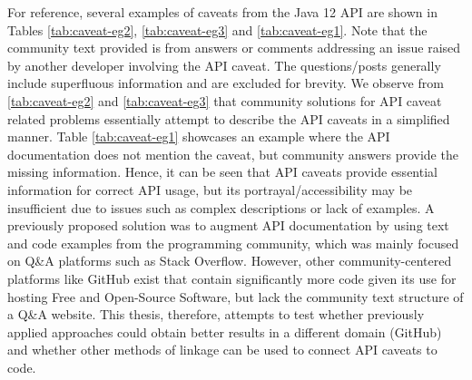 For reference, several examples of caveats from the Java 12 API are shown in Tables \ref{tab:caveat-eg2}, \ref{tab:caveat-eg3} and \ref{tab:caveat-eg1}. Note that the community text provided is from answers or comments addressing an issue raised by another developer involving the API caveat. The questions/posts generally include superfluous information and are excluded for brevity. We observe from \ref{tab:caveat-eg2} and \ref{tab:caveat-eg3} that community solutions for API caveat related problems essentially attempt to describe the API caveats in a simplified manner. Table \ref{tab:caveat-eg1} showcases an example where the API documentation does not mention the caveat, but community answers provide the missing information. Hence, it can be seen that API caveats provide essential information for correct API usage, but its portrayal/accessibility may be insufficient due to issues such as complex descriptions or lack of examples. A previously proposed solution was to augment API documentation by using text and code examples from the programming community, which was mainly focused on Q\&A platforms such as Stack Overflow.  However, other community-centered platforms like GitHub exist that contain significantly more code given its use for hosting Free and Open-Source Software, but lack the community text structure of a Q\&A website. This thesis, therefore, attempts to test whether previously applied approaches could obtain better results in a different domain (GitHub) and whether other methods of linkage can be used to connect API caveats to code.
\clearpage
